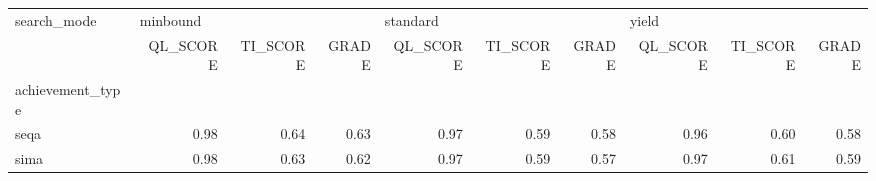 \begin{tabular}{lrrrrrrrrr}
\toprule
search\_mode & \multicolumn{3}{l}{minbound} & \multicolumn{3}{l}{standard} & \multicolumn{3}{l}{yield} \\
{} & QL\_SCORE & TI\_SCORE & GRADE & QL\_SCORE & TI\_SCORE & GRADE & QL\_SCORE & TI\_SCORE & GRADE \\
achievement\_type &          &          &       &          &          &       &          &          &       \\
\midrule
seqa             &     0.98 &     0.64 &  0.63 &     0.97 &     0.59 &  0.58 &     0.96 &     0.60 &  0.58 \\
sima             &     0.98 &     0.63 &  0.62 &     0.97 &     0.59 &  0.57 &     0.97 &     0.61 &  0.59 \\
\bottomrule
\end{tabular}
